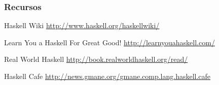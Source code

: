 \documentclass[12pt]{beamer}
\begin{document}
\begin{frame}
    \frametitle{Recursos}
    \begin{thebibliography}{99}
        Haskell Wiki
        \newblock \url{http://www.haskell.org/haskellwiki/}

        Learn You a Haskell For Great Good!
        \newblock \url{http://learnyouahaskell.com/}

        Real World Haskell
        \newblock \url{http://book.realworldhaskell.org/read/}

        Haskell Cafe
        \newblock \url{http://news.gmane.org/gmane.comp.lang.haskell.cafe}
    \end{thebibliography}
\end{frame}
\end{document}
